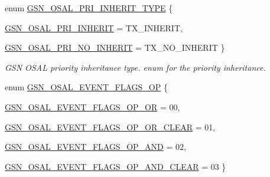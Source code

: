 \begin{DoxyCompactItemize}
enum \hyperlink{a00628_ga4b070e363e5202d1c7e6ffe017b981b9}{GSN\_\-OSAL\_\-PRI\_\-INHERIT\_\-TYPE} \{ \par
\hyperlink{a00628_gga4b070e363e5202d1c7e6ffe017b981b9a9f5a8464df10078a40932796037dbe21}{GSN\_\-OSAL\_\-PRI\_\-INHERIT} =  TX\_\-INHERIT, 
\par
\hyperlink{a00628_gga4b070e363e5202d1c7e6ffe017b981b9af4c1fbe390b0fce01a5e223d4f01364c}{GSN\_\-OSAL\_\-PRI\_\-NO\_\-INHERIT} =  TX\_\-NO\_\-INHERIT
 \}
\begin{DoxyCompactList}\small\item\em GSN OSAL priority inheritance type. enum for the priority inheritance. \end{DoxyCompactList}\item 
enum \hyperlink{a00536_ab43ce60f761c421854ded68117c8f8f2}{GSN\_\-OSAL\_\-EVENT\_\-FLAGS\_\-OP} \{ \par
\hyperlink{a00536_ab43ce60f761c421854ded68117c8f8f2a8fe27d7399c9dbd00d2bd683f2c36000}{GSN\_\-OSAL\_\-EVENT\_\-FLAGS\_\-OP\_\-OR} =  00, 
\par
\hyperlink{a00536_ab43ce60f761c421854ded68117c8f8f2a30ef1c68c1b738b1245698b0ca0c0e35}{GSN\_\-OSAL\_\-EVENT\_\-FLAGS\_\-OP\_\-OR\_\-CLEAR} =  01, 
\par
\hyperlink{a00536_ab43ce60f761c421854ded68117c8f8f2ac4ff97c77b4cae846d17061ee4deaeab}{GSN\_\-OSAL\_\-EVENT\_\-FLAGS\_\-OP\_\-AND} =  02, 
\par
\hyperlink{a00536_ab43ce60f761c421854ded68117c8f8f2a7caf2f4431cbf9b2eca54ec01720bfca}{GSN\_\-OSAL\_\-EVENT\_\-FLAGS\_\-OP\_\-AND\_\-CLEAR} =  03
 \}
\end{DoxyCompactItemize}
